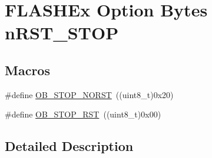 \hypertarget{group___f_l_a_s_h_ex___option___bytes__n_r_s_t___s_t_o_p}{\section{F\-L\-A\-S\-H\-Ex Option Bytes n\-R\-S\-T\-\_\-\-S\-T\-O\-P}
\label{group___f_l_a_s_h_ex___option___bytes__n_r_s_t___s_t_o_p}
}
\subsection*{Macros}
\begin{DoxyCompactItemize}
\item 
\#define \hyperlink{group___f_l_a_s_h_ex___option___bytes__n_r_s_t___s_t_o_p_gac440badc145bc62ab85e1cbca9483584}{O\-B\-\_\-\-S\-T\-O\-P\-\_\-\-N\-O\-R\-S\-T}~((uint8\-\_\-t)0x20)
\item 
\#define \hyperlink{group___f_l_a_s_h_ex___option___bytes__n_r_s_t___s_t_o_p_gaef92c03b1f279c532bfa13d3bb074b57}{O\-B\-\_\-\-S\-T\-O\-P\-\_\-\-R\-S\-T}~((uint8\-\_\-t)0x00)
\end{DoxyCompactItemize}


\subsection{Detailed Description}


